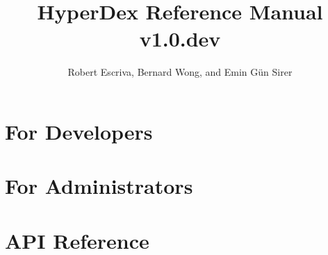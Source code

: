 \documentclass[10pt,oneside]{book}
\title{HyperDex Reference Manual v1.0.dev}
\author{Robert Escriva, Bernard Wong, and Emin G{\"u}n Sirer}
\newcommand*{\topdir}{.}%
\newcommand*{\topdir}{..}%
\begin{document}
\frontmatter
\maketitle
\tableofcontents

\mainmatter




\part{For Developers}
\label{part:for-developers}




%

\part{For Administrators}
\label{part:for-admins}





\part{API Reference}
\label{part:api-ref}


\backmatter

\clearpage
{}
\printindex

\clearpage
{}


\end{document}
